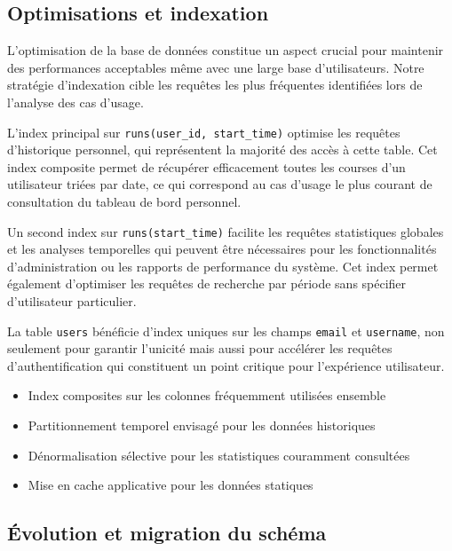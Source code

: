 \subsection{Optimisations et indexation}

L'optimisation de la base de données constitue un aspect crucial pour maintenir des performances acceptables même avec une large base d'utilisateurs. Notre stratégie d'indexation cible les requêtes les plus fréquentes identifiées lors de l'analyse des cas d'usage.

L'index principal sur \texttt{runs(user\_id, start\_time)} optimise les requêtes d'historique personnel, qui représentent la majorité des accès à cette table. Cet index composite permet de récupérer efficacement toutes les courses d'un utilisateur triées par date, ce qui correspond au cas d'usage le plus courant de consultation du tableau de bord personnel.

Un second index sur \texttt{runs(start\_time)} facilite les requêtes statistiques globales et les analyses temporelles qui peuvent être nécessaires pour les fonctionnalités d'administration ou les rapports de performance du système. Cet index permet également d'optimiser les requêtes de recherche par période sans spécifier d'utilisateur particulier.

La table \texttt{users} bénéficie d'index uniques sur les champs \texttt{email} et \texttt{username}, non seulement pour garantir l'unicité mais aussi pour accélérer les requêtes d'authentification qui constituent un point critique pour l'expérience utilisateur.

\begin{successbox}
\begin{itemize}[leftmargin=1cm]
\item Index composites sur les colonnes fréquemment utilisées ensemble
\item Partitionnement temporel envisagé pour les données historiques
\item Dénormalisation sélective pour les statistiques couramment consultées
\item Mise en cache applicative pour les données statiques
\end{itemize}
\end{successbox}

\subsection{Évolution et migration du schéma}

